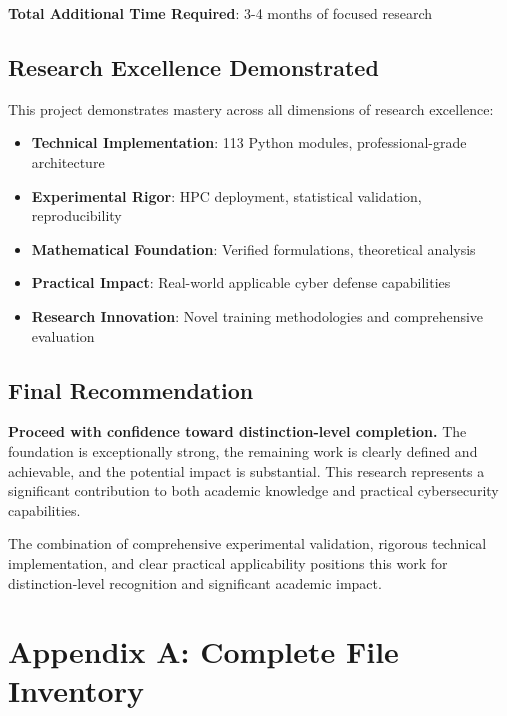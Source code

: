 \documentclass[11pt]{article}
\begin{document}
\textbf{Total Additional Time Required}: 3-4 months of focused research

\subsection{Research Excellence Demonstrated}

This project demonstrates mastery across all dimensions of research excellence:
\begin{itemize}
\item \textbf{Technical Implementation}: 113 Python modules, professional-grade architecture
\item \textbf{Experimental Rigor}: HPC deployment, statistical validation, reproducibility
\item \textbf{Mathematical Foundation}: Verified formulations, theoretical analysis
\item \textbf{Practical Impact}: Real-world applicable cyber defense capabilities
\item \textbf{Research Innovation}: Novel training methodologies and comprehensive evaluation
\end{itemize}

\subsection{Final Recommendation}

\textbf{Proceed with confidence toward distinction-level completion.} The foundation is exceptionally strong, the remaining work is clearly defined and achievable, and the potential impact is substantial. This research represents a significant contribution to both academic knowledge and practical cybersecurity capabilities.

The combination of comprehensive experimental validation, rigorous technical implementation, and clear practical applicability positions this work for distinction-level recognition and significant academic impact.

\newpage
\appendix

\section{Appendix A: Complete File Inventory}
\end{document}
